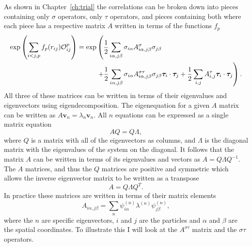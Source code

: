 As shown in Chapter~\ref{ch:trial} the correlations can be broken down into pieces containing only $\sigma$ operators, only $\tau$ operators, and pieces containing both where each piece has a respective matrix $A$ written in terms of the functions $f_p$
\begin{equation}
\begin{split}
   \exp\left(\sum\limits_{i<j,p}f_p(r_{ij})\mathcal{O}^p_{ij}\right) = \exp&\left(\frac{1}{2}\sum\limits_{i\alpha,j\beta} \sigma_{i\alpha}A^{\sigma}_{i\alpha,j\beta}\sigma_{j\beta}\right. \\
      &\left. + \frac{1}{2}\sum\limits_{i\alpha,j\beta} \sigma_{i\alpha}A^{\sigma\tau}_{i\alpha,j\beta}\sigma_{j\beta}\bm{\tau}_i\cdot\bm{\tau}_j
      + \frac{1}{2}\sum\limits_{i,j} A^{\tau}_{i,j}\bm{\tau}_i\cdot\bm{\tau}_j\right).
\end{split}
\end{equation}
All three of these matrices can be written in terms of their eigenvalues and eigenvectors using eigendecomposition. The eigenequation for a given $A$ matrix can be written as $A\mathbf{v}_n = \lambda_n\mathbf{v}_n$. All $n$ equations can be expressed as a single matrix equation
\begin{equation}
   AQ = Q\Lambda,
\end{equation}
where $Q$ is a matrix with all of the eigenvectors as columns, and $\Lambda$ is the diagonal matrix with the eigenvalues of the system on the diagonal. It follows that the matrix $A$ can be written in terms of its eigenvalues and vectors as $A = Q\Lambda Q^{-1}$. The $A$ matrices, and thus the $Q$ matrices are positive and symmetric which allows the inverse eigenvector matrix to be written as a transpose
\begin{equation}
   A = Q\Lambda Q^T.
\end{equation}
In practice these matrices are written in terms of their matrix elements
\begin{equation}
   A_{i\alpha,j\beta} = \sum\limits_n \psi^{(n)}_{i\alpha}\lambda^{(n)}\psi^{(n)}_{j\beta},
\end{equation}
where the $n$ are specific eigenvectors, $i$ and $j$ are the particles and $\alpha$ and $\beta$ are the spatial coordinates. To illustrate this I will look at the $A^{\sigma\tau}$ matrix and the $\sigma\tau$ operators.

